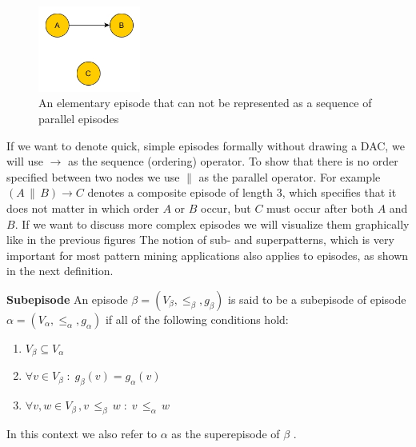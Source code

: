 \begin{figure}[h]
	\centering
  	\includegraphics[width=0.3\textwidth]{notSequenceOfSet}
	\caption{An elementary episode that can not be represented as a sequence of parallel episodes}
	\label{fig_notSequenceOfSet}
\end{figure}

If we want to denote quick, simple episodes formally without drawing a DAC, we will use $\rightarrow$ as the sequence (ordering) operator. To show that there is no order specified between two nodes we use $\|$ as the parallel operator. For example $(A \, \| \, B ) \rightarrow C$ denotes a composite episode of length 3, which specifies that it does not matter in which order $A$ or $B$ occur, but $C$ must occur after both $A$ and $B$. If we want to discuss more complex episodes we will visualize them graphically like in the previous figures \newline  
The notion of sub- and superpatterns, which is very important for most pattern mining applications also applies to episodes, as shown in the next definition.

\begin{mydef}
\label{def_subEpisode}
\textbf{Subepisode} An episode $\beta = (V_\beta,{\leq}_{\beta},g_\beta)$ is said to be a subepisode of episode $\alpha = (V_\alpha,{\leq}_{\alpha},g_\alpha)$ if all of the following conditions hold:
\begin{enumerate}
	\item $V_\beta \subseteq V_\alpha$
	\item $\forall v \in V_\beta \; : \; g_{\beta}(v) = g_\alpha (v) $
	\item $\forall v,w \in V_\beta \, , v \, {\leq}_{\beta} \, w \; : \; v \, {\leq}_{\alpha} \, w$
\end{enumerate}
In this context we also refer to $\alpha$ as the superepisode of $\beta$ \cite{mannila1995discovering} \cite{laxman2007fast}.
\end{mydef}

